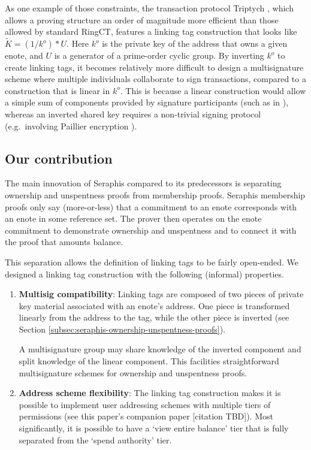 As one example of those constraints, the transaction protocol Triptych \cite{triptych-preprint}, which allows a proving structure an order of magnitude more efficient than those allowed by standard RingCT, features a linking tag construction that looks like $\tilde{K} = (1/k^o)*U$. Here $k^o$ is the private key of the address that owns a given enote, and $U$ is a generator of a prime-order cyclic group. By inverting $k^o$ to create linking tags, it becomes relatively more difficult to design a multisignature scheme where multiple individuals collaborate to sign transactions, compared to a construction that is linear in $k^o$. This is because a linear construction would allow a simple sum of components provided by signature participants (such as in \cite{MRL-0009-multisig}), whereas an inverted shared key requires a non-trivial signing protocol (e.g.\ involving Paillier encryption \cite{inversion-style-multisig-mrl-72}).


\subsection{Our contribution}
\label{subsec:intro-our-contribution}

The main innovation of Seraphis compared to its predecessors is separating ownership and unspentness proofs from membership proofs. Seraphis membership proofs only say (more-or-less) that a commitment to an enote corresponds with an enote in some reference set. The prover then operates on the enote commitment to demonstrate ownership and unspentness and to connect it with the proof that amounts balance.

This separation allows the definition of linking tags to be fairly open-ended. We designed a linking tag construction with the following (informal) properties.

\begin{enumerate}
    \item \textbf{Multisig compatibility}: Linking tags are composed of two pieces of private key material associated with an enote's address. One piece is transformed linearly from the address to the tag, while the other piece is inverted (see Section \ref{subsec:seraphis-ownership-unspentness-proofs}).

    A multisignature group may share knowledge of the inverted component and split knowledge of the linear component. This facilities straightforward multisignature schemes for ownership and unspentness proofs.

    \item \textbf{Address scheme flexibility}: The linking tag construction makes it is possible to implement user addressing schemes with multiple tiers of permissions (see this paper's companion paper [citation TBD]). Most significantly, it is possible to have a `view entire balance' tier that is fully separated from the `spend authority' tier.
\end{enumerate}

